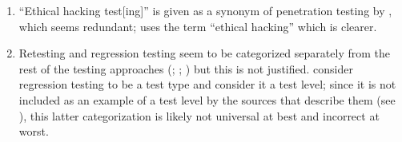 \begin{enumerate}
          ``fault'' have distinct meanings (\citealp[pp.~165,
              179]{IEEE2017}; \citeyear[pp.~128, 140]{IEEE2010};
          \citealp[p.~12\=/3]{SWEBOK2025}\footnote{
              \citet[p.~12\=/3]{SWEBOK2025} references the definitions given in
              \citep[pp.~165, 179]{IEEE2017}; while we would usually omit the
              former in favour of the original source, we include it here as an
              example of a flaw within a document.};
          \citealp[pp.~399\==400]{vanVliet2000}). The intent of this
          term-definition pair is unclear, as the strategies given---``backing
          up and retrying, using auxiliary code and voting algorithms, and
          replacing an erroneous value with a phony value that will have a
          benign effect'' \citep[p.~4\=/11]{SWEBOK2025}---could be used for
          errors or faults.
    \item %
          ``Ethical hacking test[ing]'' is given as a synonym of penetration
          testing by \citet[p.~13\=/5]{SWEBOK2025}, which seems redundant;
          \citet[p.~28]{Gerrard2000b} uses the term ``ethical hacking'' which
          is clearer.
    \item %
          Retesting and regression testing seem to be categorized separately
          from the rest of the testing approaches (\citealp[pp.~15, 23]{IEEE2022};
          \citeyear[p.~8]{IEEE2021a}; \citeyear[p.~4]{IEEE2021b}) but this is
          not justified. \citetISTQB{} consider regression testing to be a test
          type and \citet[p.~3]{BarbosaEtAl2006} consider it a test level;
          since it is not included as an example of a test level by the sources
          that describe them (see ), this latter categorization
          is likely not universal at best and incorrect at worst.

\end{enumerate}
